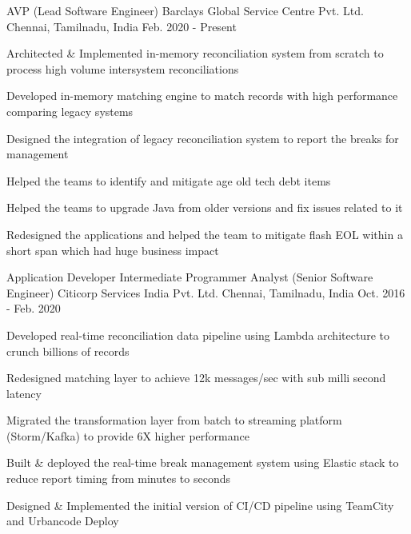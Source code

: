 

\begin{cventries}

  \cventry
    {AVP (Lead Software Engineer)} %
    {Barclays Global Service Centre Pvt. Ltd.} %
    {Chennai, Tamilnadu, India} %
    {Feb. 2020 - Present} %
    {
      \begin{cvitems} %
        \item {Architected \& Implemented in-memory reconciliation system from scratch to process high volume intersystem reconciliations}
        \item {Developed in-memory matching engine to match records with high performance comparing legacy systems}
        \item {Designed the integration of legacy reconciliation system to report the breaks for management}
        \item {Helped the teams to identify and mitigate age old tech debt items}
        \item {Helped the teams to upgrade Java from older versions and fix issues related to it}
        \item {Redesigned the applications and helped the team to mitigate flash EOL within a short span which had huge business impact}
      \end{cvitems}
    }

  \cventry
    {Application Developer Intermediate Programmer Analyst (Senior Software Engineer)} %
    {Citicorp Services India Pvt. Ltd.} %
    {Chennai, Tamilnadu, India} %
    {Oct. 2016 - Feb. 2020} %
    {
      \begin{cvitems} %
        \item {Developed real-time reconciliation data pipeline using Lambda architecture to crunch billions of records}
        \item {Redesigned matching layer to achieve 12k messages/sec with sub milli second latency}
        \item {Migrated the transformation layer from batch to streaming platform (Storm/Kafka) to provide 6X higher performance}
        \item {Built \& deployed the real-time break management system using Elastic stack to reduce report timing from minutes to seconds}
        \item {Designed \& Implemented the initial version of CI/CD pipeline using TeamCity and Urbancode Deploy}        
      \end{cvitems}
    }


\end{cventries}

